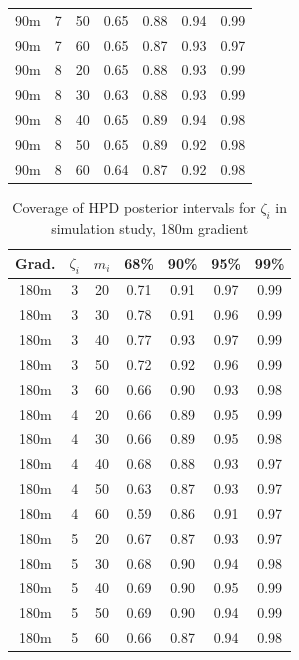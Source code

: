 \begin{table}
\begin{center}
\begin{tabular}{ccc|cccc}
  90m &   7 &  50 & 0.65 & 0.88 & 0.94 & 0.99 \\ 
  90m &   7 &  60 & 0.65 & 0.87 & 0.93 & 0.97 \\ 
   \hline
90m &   8 &  20 & 0.65 & 0.88 & 0.93 & 0.99 \\ 
  90m &   8 &  30 & 0.63 & 0.88 & 0.93 & 0.99 \\ 
  90m &   8 &  40 & 0.65 & 0.89 & 0.94 & 0.98 \\ 
  90m &   8 &  50 & 0.65 & 0.89 & 0.92 & 0.98 \\ 
  90m &   8 &  60 & 0.64 & 0.87 & 0.92 & 0.98 \\ 
   \hline
\end{tabular}
\end{center}
\end{table}

\begin{table}
\begin{center}
\caption{Coverage of HPD posterior intervals for $\zeta_i$ in simulation study, 180m gradient
\label{supp:proteomics:tab:sim_coverage_180m}}
\begin{tabular}{ccc|cccc}
 Grad. & $\zeta_i$ & $m_i$ & 68\% & 90\% & 95\% & 99\% \\ 
  \hline
180m &   3 &  20 & 0.71 & 0.91 & 0.97 & 0.99 \\ 
  180m &   3 &  30 & 0.78 & 0.91 & 0.96 & 0.99 \\ 
  180m &   3 &  40 & 0.77 & 0.93 & 0.97 & 0.99 \\ 
  180m &   3 &  50 & 0.72 & 0.92 & 0.96 & 0.99 \\ 
  180m &   3 &  60 & 0.66 & 0.90 & 0.93 & 0.98 \\ 
   \hline
180m &   4 &  20 & 0.66 & 0.89 & 0.95 & 0.99 \\ 
  180m &   4 &  30 & 0.66 & 0.89 & 0.95 & 0.98 \\ 
  180m &   4 &  40 & 0.68 & 0.88 & 0.93 & 0.97 \\ 
  180m &   4 &  50 & 0.63 & 0.87 & 0.93 & 0.97 \\ 
  180m &   4 &  60 & 0.59 & 0.86 & 0.91 & 0.97 \\ 
   \hline
180m &   5 &  20 & 0.67 & 0.87 & 0.93 & 0.97 \\ 
  180m &   5 &  30 & 0.68 & 0.90 & 0.94 & 0.98 \\ 
  180m &   5 &  40 & 0.69 & 0.90 & 0.95 & 0.99 \\ 
  180m &   5 &  50 & 0.69 & 0.90 & 0.94 & 0.99 \\ 
  180m &   5 &  60 & 0.66 & 0.87 & 0.94 & 0.98 \\ 

\end{tabular}
\end{center}
\end{table}
